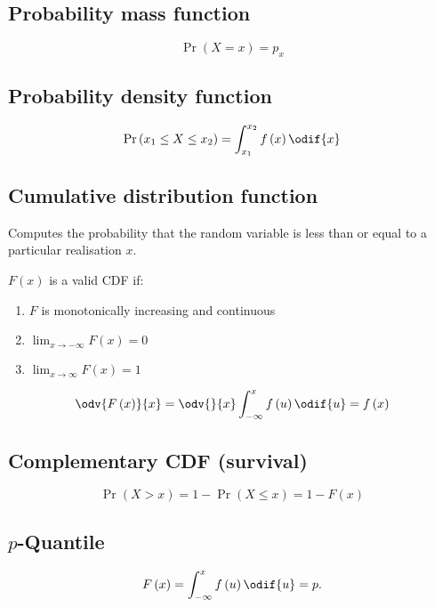 \documentclass{article}
\begin{document}
\begin{multicols}{3}
    \subsection{Probability mass function}
    \begin{equation*}
        \Pr{\left( X = x \right)} = p_x
    \end{equation*}
    \subsection{Probability density function}
    \begin{equation*}
        \Pr{\left( x_1 \leq X \leq x_2 \right)} = \int_{x_1}^{x_2} f\left( x \right) \odif{x}
    \end{equation*}
    \subsection{Cumulative distribution function}
    Computes the probability that the random variable is
    less than or equal to a particular realisation \(x\).

    \(F\left( x \right)\) is a valid CDF if:
    \begin{enumerate}
        \item \(F\) is monotonically increasing and continuous
        \item \(\lim_{x \to -\infty} F\left( x \right) = 0\)
        \item \(\lim_{x \to \infty} F\left( x \right) = 1\)
    \end{enumerate}
    \begin{equation*}
        \odv{F\left( x \right)}{x} = \odv{}{x} \int_{-\infty}^x f\left( u \right) \odif{u} = f\left( x \right)
    \end{equation*}
    \subsection{Complementary CDF (survival)}
    \begin{equation*}
        \Pr{\left( X > x \right)} = 1 - \Pr{\left( X \leq x \right)} = 1 - F\left( x \right)
    \end{equation*}
    \subsection{\(p\)-Quantile}
    \begin{equation*}
        F\left( x \right) = \int_{-\infty}^x f\left( u \right) \odif{u} = p.
    \end{equation*}

\end{multicols}
\end{document}

